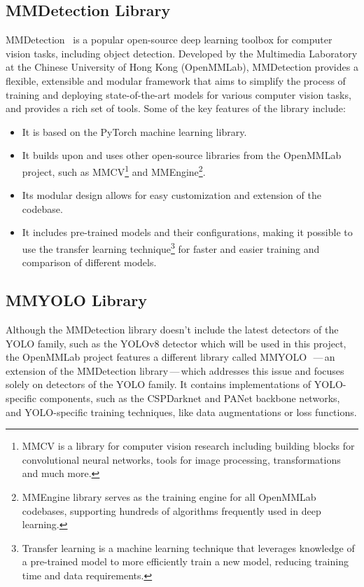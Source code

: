 \subsection{MMDetection Library}

MMDetection~\cite{MMDetection} is a popular open-source deep learning toolbox
for computer vision tasks, including object detection. Developed by the
Multimedia Laboratory at the Chinese University of Hong Kong (OpenMMLab),
MMDetection provides a flexible, extensible and modular framework that aims to
simplify the process of training and deploying state-of-the-art models for
various computer vision tasks, and provides a rich set of tools. Some of the key
features of the library include:

\begin{itemize}
    \item It is based on the PyTorch machine learning library.
    \item It builds upon and uses other open-source libraries from the OpenMMLab
    project, such as MMCV\footnote{MMCV is a library for computer vision
    research including building blocks for convolutional neural networks, tools
    for image processing, transformations and much more.} and
    MMEngine\footnote{MMEngine library serves as the training engine for all
    OpenMMLab codebases, supporting hundreds of algorithms frequently used in
    deep learning.}.
    \item Its modular design allows for easy customization and extension
    of the codebase.
    \item It includes pre-trained models and their configurations, making it
    possible to use the transfer learning technique\footnote{Transfer learning
    is a machine learning technique that leverages knowledge of a pre-trained
    model to more efficiently train a new model, reducing training time and data
    requirements.} for faster and easier training and comparison of different
    models.
\end{itemize}


\subsection{MMYOLO Library}

Although the MMDetection library doesn't include the latest detectors of the
YOLO family, such as the YOLOv8 detector which will be used in this project, the
OpenMMLab project features a different library called
MMYOLO~\cite{MMYOLO}\,---\,an extension of the MMDetection library\,---\,which
addresses this issue and focuses solely on detectors of the YOLO family. It
contains implementations of YOLO-specific components, such as the CSPDarknet and
PANet backbone networks, and YOLO-specific training techniques, like data
augmentations or loss functions.


